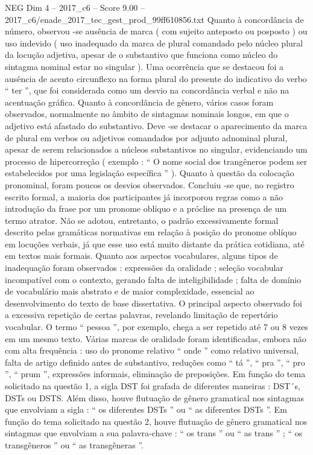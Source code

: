 \begin{textsample}{NEG Dim 4 – 2017\_c6 – Score 9.00 – 2017\_c6/enade\_2017\_tec\_gest\_prod\_99ff610856.txt}
Quanto à concordância de número, observou -se ausência de marca ( com sujeito anteposto ou posposto ) ou uso indevido ( uso inadequado da marca de plural comandado pelo núcleo plural da locução adjetiva, apesar de o substantivo que funciona como núcleo do sintagma nominal estar no singular ).
Uma ocorrência que se destacou foi a ausência de acento circunflexo na forma plural do presente do indicativo do verbo “ ter ”, que foi considerada como um desvio na concordância verbal e não na acentuação gráfica.
Quanto à concordância de gênero, vários casos foram observados, normalmente no âmbito de sintagmas nominais longos, em que o adjetivo está afastado do substantivo.
Deve -se destacar o aparecimento da marca de plural em verbos ou adjetivos comandados por adjunto adnominal plural, apesar de serem relacionados a núcleos substantivos no singular, evidenciando um processo de hipercorreção ( exemplo : “ O nome social dos trangêneros podem ser estabelecidos por uma legislação específica ” ).
Quanto à questão da colocação pronominal, foram poucos os desvios observados.
Concluiu -se que, no registro escrito formal, a maioria dos participantes já incorporou regras como a não introdução da frase por um pronome oblíquo e a próclise na presença de um termo atrator.
Não se adotou, entretanto, o padrão excessivamente formal descrito pelas gramáticas normativas em relação à posição do pronome oblíquo em locuções verbais, já que esse uso está muito distante da prática cotidiana, até em textos mais formais.
Quanto aos aspectos vocabulares, alguns tipos de inadequação foram observados : expressões da oralidade ; seleção vocabular incompatível com o contexto, gerando falta de inteligibilidade ; falta de domínio de vocabulário mais abstrato e de maior complexidade, essencial ao desenvolvimento do texto de base dissertativa.
O principal aspecto observado foi a excessiva repetição de certas palavras, revelando limitação de repertório vocabular.
O termo “ pessoa ”, por exemplo, chega a ser repetido até 7 ou 8 vezes em um mesmo texto.
Várias marcas de oralidade foram identificadas, embora não com alta frequência : uso do pronome relativo “ onde ” como relativo universal, falta de artigo definido antes de substantivo, reduções como “ tá ”, “ pra ”, “ pro ”, “ prum ”, expressões informais, eliminação de preposições.
Em função do tema solicitado na questão 1, a sigla DST foi grafada de diferentes maneiras : DST´s, DSTs ou DSTS.
Além disso, houve flutuação de gênero gramatical nos sintagmas que envolviam a sigla : “ os diferentes DSTs ” ou “ as diferentes DSTs ”.
Em função do tema solicitado na questão 2, houve flutuação de gênero gramatical nos sintagmas que envolviam a sua palavra-chave : “ os trans ” ou “ as trans ” ; “ os transgêneros ” ou “ as transgêneras ”.

\end{textsample}
